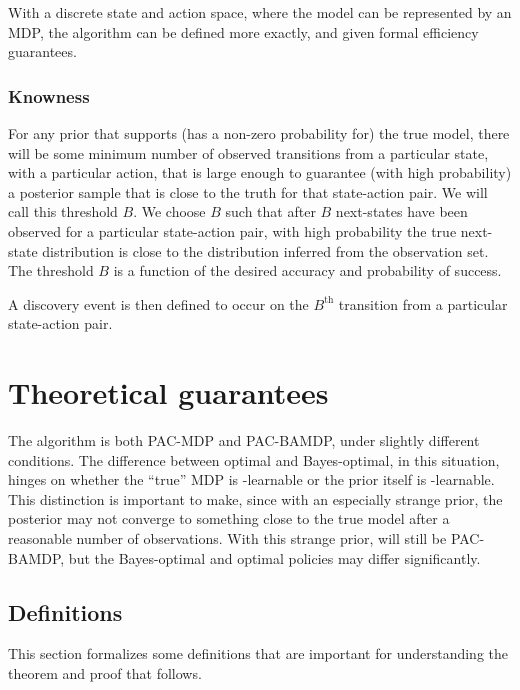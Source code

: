 With a discrete state and action space, where the model can be represented by an MDP, the  algorithm can be defined more exactly, and given formal efficiency guarantees.

\subsubsection{Knowness}

For any prior that supports (has a non-zero probability for) the true model, there will be some minimum number of observed transitions from a particular state, with a particular action, that is large enough to guarantee (with high probability) a posterior sample that is close to the truth for that state-action pair. We will call this threshold $B$. We choose $B$ such that after $B$ next-states have been observed for a particular state-action pair, with high probability the true next-state distribution is close to the distribution inferred from the observation set. The threshold $B$ is a function of the desired accuracy and probability of success.

A discovery event is then defined to occur on the $B^{\mbox{th}}$ transition from a particular state-action pair.

\section{Theoretical guarantees}

The  algorithm is both PAC-MDP and PAC-BAMDP, under slightly different conditions. The difference between optimal and Bayes-optimal, in this situation, hinges on whether the ``true'' MDP is \bed-learnable or the prior itself is \bed-learnable. This distinction is important to make, since with an especially strange prior, the posterior may not converge to something close to the true model after a reasonable number of observations. With this strange prior,  will still be PAC-BAMDP, but the Bayes-optimal and optimal policies may differ significantly.

\subsection{Definitions}

This section formalizes some definitions that are important for understanding the theorem and proof that follows.

